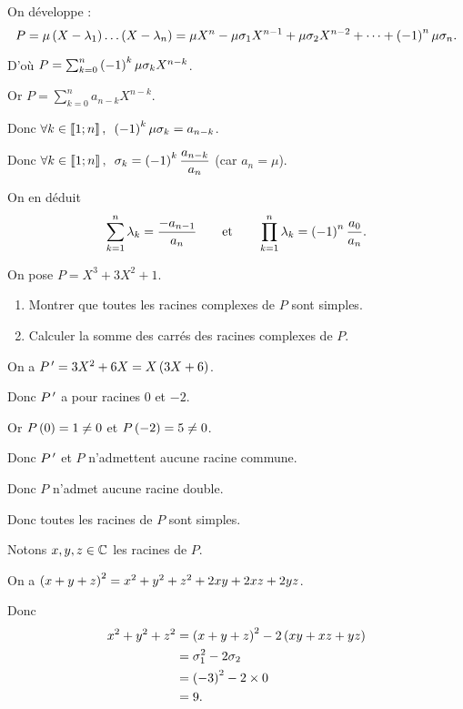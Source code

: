 \begin{dem}[Idée]
On développe : \[P=\mu\left(X-\lambda_1\right)\dots\left(X-\lambda_n\right)=\mu X^n-\mu\sigma_1 X^{n-1}+\mu\sigma_2 X^{n-2}+\dots+\left(-1\right)^n\mu\sigma_n.\]

D'où \(P=\sum_{k=0}^n\left(-1\right)^k\mu\sigma_k X^{n-k}\).

Or \(P=\sum_{k=0}^na_{n-k}X^{n-k}\).

Donc \(\quantifs{\forall k\in\interventierii{1}{n}}\paren{-1}^k\mu\sigma_k=a_{n-k}\).

Donc \(\quantifs{\forall k\in\interventierii{1}{n}}\sigma_k=\paren{-1}^k\dfrac{a_{n-k}}{a_n}\) (car \(a_n=\mu\)).

On en déduit \[\sum_{k=1}^n\lambda_k=\dfrac{-a_{n-1}}{a_n}\qquad\text{et}\qquad\prod_{k=1}^n\lambda_k=\left(-1\right)^n\dfrac{a_0}{a_n}.\]
\end{dem}

\begin{exo}
On pose \(P=X^3+3X^2+1\).

\begin{enumerate}
\item Montrer que toutes les racines complexes de \(P\) sont simples. \\

\item Calculer la somme des carrés des racines complexes de \(P\).
\end{enumerate}
\end{exo}

\begin{corr}[1]
On a \(P^{\,\prime}=3X^2+6X=X\left(3X+6\right)\).

Donc \(P^{\,\prime}\) a pour racines \(0\) et \(-2\).

Or \(P\left(0\right)=1\not=0\) et \(P\left(-2\right)=5\not=0\).

Donc \(P^{\,\prime}\) et \(P\) n'admettent aucune racine commune.

Donc \(P\) n'admet aucune racine double.

Donc toutes les racines de \(P\) sont simples.
\end{corr}

\begin{corr}[2]
Notons \(x,y,z\in\mathbb{C}\) les racines de \(P\).

On a \(\left(x+y+z\right)^2=x^2+y^2+z^2+2xy+2xz+2yz\).

Donc \[\begin{aligned}
x^2+y^2+z^2&=\left(x+y+z\right)^2-2\left(xy+xz+yz\right) \\
&=\sigma_1^2-2\sigma_2 \\
&=\left(-3\right)^2-2\times0 \\
&=9.
\end{aligned}\]
\end{corr}

